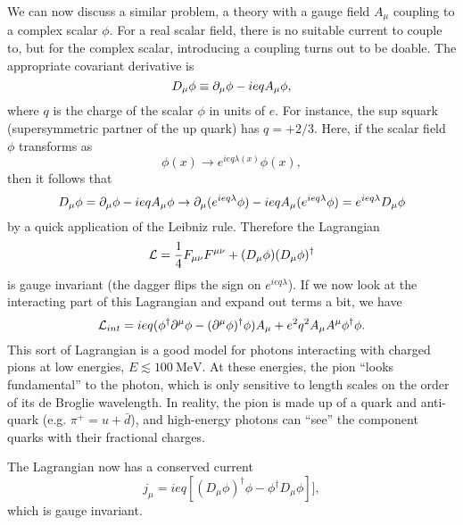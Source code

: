 We can now discuss a similar problem, a theory with a gauge field $A_\mu$ coupling to a complex scalar $\phi$. For a real scalar field, there is no suitable current to couple to, but for the complex scalar, introducing a coupling turns out to be doable. The appropriate covariant derivative is
\begin{equation}
    D_\mu \phi \equiv \partial_\mu \phi - ieq A_\mu \phi,
\end{equation}
where $q$ is the charge of the scalar $\phi$ in units of $e$. For instance, the sup squark (supersymmetric partner of the up quark) has $q=+2/3$. Here, if the scalar field $\phi$ transforms as
\begin{equation}
    \phi(x) \to e^{ie q \lambda(x)}\phi(x),
\end{equation}
then it follows that
\begin{equation}
    D_\mu \phi=\partial_\mu \phi - ieq A_\mu \phi \to \partial_\mu (e^{ie q \lambda}\phi) - ieq A_\mu (e^{ie q\lambda}\phi) = e^{ie q \lambda} D_\mu \phi
\end{equation}
by a quick application of the Leibniz rule. Therefore the Lagrangian
\begin{equation}
    \mathcal L = \frac{1}{4} F_{\mu\nu} F^{\mu\nu} + (D_\mu \phi)(D_\mu \phi)^\dagger
\end{equation}
is gauge invariant (the dagger flips the sign on $e^{ie q \lambda}$). If we now look at the interacting part of this Lagrangian and expand out terms a bit, we have
\begin{equation}
    \mathcal L_{int}= ieq (\phi^\dagger \partial^\mu \phi -(\partial^\mu \phi)^\dagger \phi)A_\mu + e^2 q^2 A_\mu A^\mu \phi^\dagger \phi.
\end{equation}
This sort of Lagrangian is a good model for photons interacting with charged pions at low energies, $E \lesssim \SI{100}{\mega\electronvolt}$. At these energies, the pion ``looks fundamental'' to the photon, which is only sensitive to length scales on the order of its de Broglie wavelength. In reality, the pion is made up of a quark and anti-quark (e.g. $\pi^+= u + \bar d$), and high-energy photons can ``see'' the component quarks with their fractional charges.

The Lagrangian now has a conserved current
$$j_\mu = ieq[(D_\mu \phi)^\dagger \phi - \phi^\dagger D_\mu \phi]],$$
which is gauge invariant.


